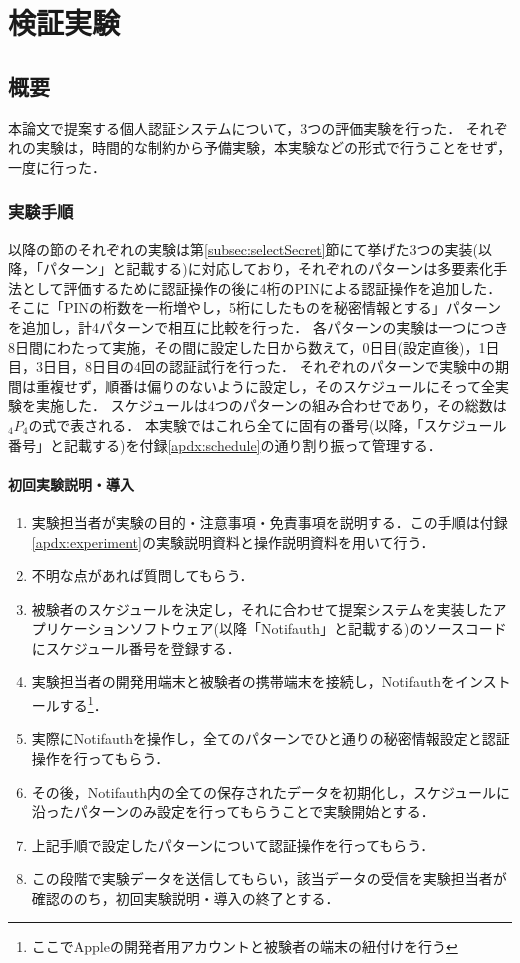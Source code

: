 \chapter{検証実験}\label{chap:experiment}

\section{概要}
本論文で提案する個人認証システムについて，3つの評価実験を行った．
それぞれの実験は，時間的な制約から予備実験，本実験などの形式で行うことをせず，一度に行った．

\subsection{実験手順}
以降の節のそれぞれの実験は第\ref{subsec:selectSecret}節にて挙げた3つの実装(以降，「パターン」と記載する)に対応しており，それぞれのパターンは多要素化手法として評価するために認証操作の後に4桁のPINによる認証操作を追加した．
そこに「PINの桁数を一桁増やし，5桁にしたものを秘密情報とする」パターンを追加し，計4パターンで相互に比較を行った．
各パターンの実験は一つにつき8日間にわたって実施，その間に設定した日から数えて，0日目(設定直後)，1日目，3日目，8日目の4回の認証試行を行った．
それぞれのパターンで実験中の期間は重複せず，順番は偏りのないように設定し，そのスケジュールにそって全実験を実施した．
スケジュールは4つのパターンの組み合わせであり，その総数は$ {}_4 P _4 $の式で表される．
本実験ではこれら全てに固有の番号(以降，「スケジュール番号」と記載する)を付録\ref{apdx:schedule}の通り割り振って管理する．

\subsubsection{初回実験説明・導入}
\begin{enumerate}
  \item 実験担当者が実験の目的・注意事項・免責事項を説明する．この手順は付録\ref{apdx:experiment}の実験説明資料と操作説明資料を用いて行う．
  \item 不明な点があれば質問してもらう．
  \item 被験者のスケジュールを決定し，それに合わせて提案システムを実装したアプリケーションソフトウェア(以降「Notifauth」と記載する)のソースコードにスケジュール番号を登録する．
  \item 実験担当者の開発用端末と被験者の携帯端末を接続し，Notifauthをインストールする\footnote{ここでAppleの開発者用アカウントと被験者の端末の紐付けを行う}．
  \item 実際にNotifauthを操作し，全てのパターンでひと通りの秘密情報設定と認証操作を行ってもらう．
  \item その後，Notifauth内の全ての保存されたデータを初期化し，スケジュールに沿ったパターンのみ設定を行ってもらうことで実験開始とする．
  \item 上記手順で設定したパターンについて認証操作を行ってもらう．
  \item この段階で実験データを送信してもらい，該当データの受信を実験担当者が確認ののち，初回実験説明・導入の終了とする．
\end{enumerate}

